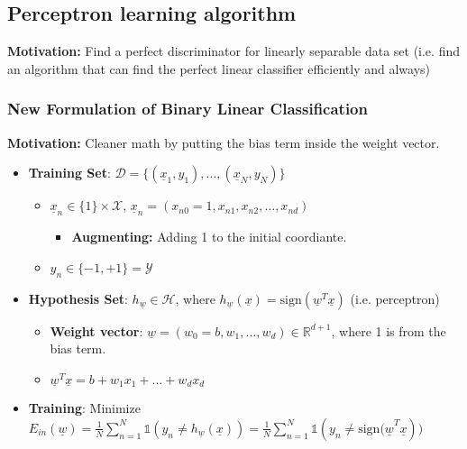 \subsection{Perceptron learning algorithm}
    \textbf{Motivation:} Find a perfect discriminator for linearly separable data set (i.e. find an algorithm that can find the perfect linear classifier efficiently and always)
    \subsubsection{New Formulation of Binary Linear Classification}
    \textbf{Motivation:} Cleaner math by putting the bias term inside the weight vector.
    \begin{definition}
        \begin{itemize}
            \item \textbf{Training Set}: $\mathcal{D} = \{(\underline{x}_1, y_1), \dots, (\underline{x}_N, y_N)\}$
            \begin{itemize}
                \item $\underline{x}_n \in \{1\} \times \mathcal{X}$, $\underline{x}_n = (x_{n0} = 1, x_{n1}, x_{n2}, \dots, x_{nd})$
                \begin{itemize}
                    \item \textbf{Augmenting:} Adding 1 to the initial coordiante.
                \end{itemize}
                \item $y_n \in \{-1, +1\} = \mathcal{Y}$
            \end{itemize}
            \item \textbf{Hypothesis Set}: $h_{\underline{w}} \in \mathcal{H}$, where $h_{\underline{w}}(\underline{x}) = \text{sign}(\underline{w}^T \underline{x})$ (i.e. perceptron) 
            \begin{itemize}
                \item \textbf{Weight vector}: $\underline{w} = (w_0=b, w_1, \dots, w_d) \in \mathbb{R}^{d+1}$, where 1 is from the bias term.
                \item $\underline{w}^T \underline{x} = b + w_1 x_1 + \ldots + w_d x_d$
            \end{itemize}
            \item \textbf{Training}: Minimize $E_{in}(\underline{w}) = \frac{1}{N} \sum_{n=1}^N \mathbb{1}(y_n \neq h_{\underline{w}}(\underline{x})) = \frac{1}{N} \sum_{n=1}^N \mathbb{1}(y_n \neq \text{sign}{(\underline{w}}^T \underline{x}))$
        \end{itemize}
    \end{definition}
    
